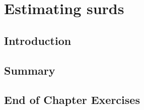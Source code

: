          \section{Estimating surds}
    \subsection{ Introduction}
    \subsection{ Summary}
        \subsection{ End of Chapter Exercises}
